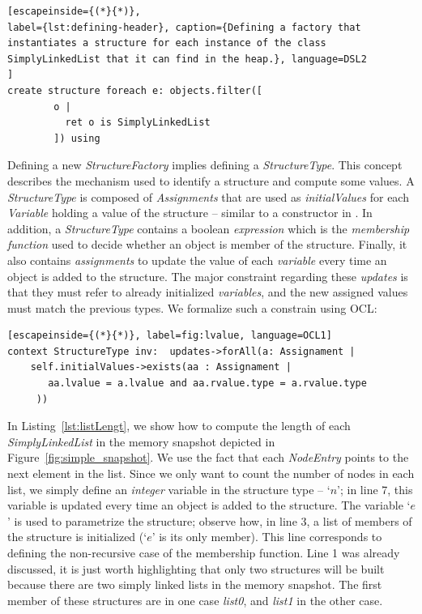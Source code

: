\begin{lstlisting}[escapeinside={(*}{*)}, 
label={lst:defining-header}, caption={Defining a factory that instantiates a structure for each instance of the class SimplyLinkedList that it can find in the heap.}, language=DSL2
]
create structure foreach e: objects.filter([
		o | 
		  ret o is SimplyLinkedList
		]) using
\end{lstlisting}

Defining a new \textit{StructureFactory} implies defining a \textit{StructureType}.
This concept describes the mechanism used to identify a structure and compute some values.
A \textit{StructureType} is composed of \textit{Assignments} that are used as \textit{initialValues} for each \textit{Variable} holding a value of the structure -- similar to a constructor in .
In addition, a \textit{StructureType} contains a boolean \textit{expression} which is the \textit{membership function} used to decide whether an object is member of the structure.
Finally, it also contains \textit{assignments} to update the value of each \textit{variable} every time an object is added to the structure.
The major constraint regarding these \textit{updates} is that they must refer to already initialized \textit{variables}, and the new assigned values must match the previous types.
We formalize such a constrain using OCL:

\begin{lstlisting}[escapeinside={(*}{*)}, label=fig:lvalue, language=OCL1]
context StructureType inv:  updates->forAll(a: Assignament | 
    self.initialValues->exists(aa : Assignament | 
       aa.lvalue = a.lvalue and aa.rvalue.type = a.rvalue.type
     ))
\end{lstlisting}


In Listing~\ref{lst:listLengt}, we show how to compute the length of each \textit{SimplyLinkedList} in the memory snapshot depicted in Figure~\ref{fig:simple_snapshot}.
We use the fact that each \textit{NodeEntry} points to the next element in the list.
Since we only want to count the number of nodes in each list, we simply define an \textit{integer} variable in the structure type -- `$n$'; in line 7, this variable is updated every time an object is added to the structure.
The variable `$e$' is used to parametrize the structure; observe how, in line 3, a list of members of the structure is initialized (`$e$' is its only member).
This line corresponds to defining the non-recursive case of the membership function.
Line 1 was already discussed, it is just worth highlighting that only two structures will be built because there are two simply linked lists in the memory snapshot.
The first member of these structures are in one case \textit{list0}, and \textit{list1} in the other case.
 

